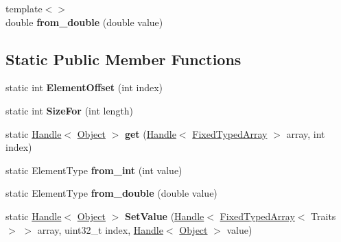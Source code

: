 \begin{DoxyCompactItemize}
\item 
\hypertarget{classv8_1_1internal_1_1_fixed_typed_array_ad03739b3007907ead1f4ca3670ae271f}{}{\footnotesize template$<$$>$ }\\double {\bfseries from\+\_\+double} (double value)\label{classv8_1_1internal_1_1_fixed_typed_array_ad03739b3007907ead1f4ca3670ae271f}

\end{DoxyCompactItemize}
\subsection*{Static Public Member Functions}
\begin{DoxyCompactItemize}
\item 
\hypertarget{classv8_1_1internal_1_1_fixed_typed_array_aa81a595e84dd930addfc95724c7774de}{}static int {\bfseries Element\+Offset} (int index)\label{classv8_1_1internal_1_1_fixed_typed_array_aa81a595e84dd930addfc95724c7774de}

\item 
\hypertarget{classv8_1_1internal_1_1_fixed_typed_array_af5f30d45ca22520e71c38de5c3243431}{}static int {\bfseries Size\+For} (int length)\label{classv8_1_1internal_1_1_fixed_typed_array_af5f30d45ca22520e71c38de5c3243431}

\item 
\hypertarget{classv8_1_1internal_1_1_fixed_typed_array_a60f5083d5bb9ee3cef640c5b43db48e0}{}static \hyperlink{classv8_1_1internal_1_1_handle}{Handle}$<$ \hyperlink{classv8_1_1internal_1_1_object}{Object} $>$ {\bfseries get} (\hyperlink{classv8_1_1internal_1_1_handle}{Handle}$<$ \hyperlink{classv8_1_1internal_1_1_fixed_typed_array}{Fixed\+Typed\+Array} $>$ array, int index)\label{classv8_1_1internal_1_1_fixed_typed_array_a60f5083d5bb9ee3cef640c5b43db48e0}

\item 
\hypertarget{classv8_1_1internal_1_1_fixed_typed_array_a7272e38ae262442c1d512fd40400b8bd}{}static Element\+Type {\bfseries from\+\_\+int} (int value)\label{classv8_1_1internal_1_1_fixed_typed_array_a7272e38ae262442c1d512fd40400b8bd}

\item 
\hypertarget{classv8_1_1internal_1_1_fixed_typed_array_ad6a083f76c0290b768254c74fc5b6cf1}{}static Element\+Type {\bfseries from\+\_\+double} (double value)\label{classv8_1_1internal_1_1_fixed_typed_array_ad6a083f76c0290b768254c74fc5b6cf1}

\item 
\hypertarget{classv8_1_1internal_1_1_fixed_typed_array_a3f126d0353d0aec59a12ab23be9e2416}{}static \hyperlink{classv8_1_1internal_1_1_handle}{Handle}$<$ \hyperlink{classv8_1_1internal_1_1_object}{Object} $>$ {\bfseries Set\+Value} (\hyperlink{classv8_1_1internal_1_1_handle}{Handle}$<$ \hyperlink{classv8_1_1internal_1_1_fixed_typed_array}{Fixed\+Typed\+Array}$<$ Traits $>$ $>$ array, uint32\+\_\+t index, \hyperlink{classv8_1_1internal_1_1_handle}{Handle}$<$ \hyperlink{classv8_1_1internal_1_1_object}{Object} $>$ value)\label{classv8_1_1internal_1_1_fixed_typed_array_a3f126d0353d0aec59a12ab23be9e2416}

\end{DoxyCompactItemize}
